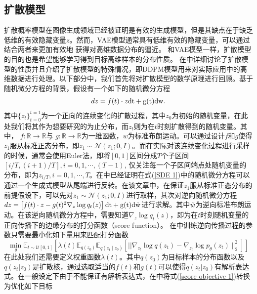 \subsection{扩散模型}
扩散概率模型在图像生成领域已经被证明是有效的生成模型，但是其缺点在于缺乏低维的有效隐藏变量$z$。然而，VAE模型通常具有低维有效的隐藏变量，可以通过结合两者来更加有效地
获得对高维数据分布的逼近。
和VAE模型一样，扩散模型的目的也是希望能够学习得到目标高维样本的分布性质。 在\cite{diffusion}中详细讨论了扩散模型的性质并且介绍了扩散模型的特殊情况，即DDPM模型用来对实际应用中的高维数据进行处理。以下部分中，我们首先将对扩散模型的数学原理进行回顾。基于随机微分方程的背景，假设有一个如下的随机微分方程
\begin{equation}
    dz = f(t)\cdot z \rm{dt}+g(t)\rm{dw}.
    \label{SDE 1}
\end{equation}
其中$\{z_t\}_{t=0}^{t=1}$为一个正向的连续变化的扩散过程，其中$z_0$为初始的随机变量，在此处我们将其作为想要研究的为止分布，而$z_t$则为在$t$时刻扩散得到的随机变量。其中， $f: \mathbb{R}\rightarrow \mathbb{R}$与
 $g: \mathbb{R}\rightarrow \mathbb{R}$为一维函数，$w$为标准布朗运动。可以通过设计$f$和$g$使得$z_1$服从标准正态分布，即$z_1\sim \mathcal{N}(z_1;0,I)$。而在实际对该连续变化过程进行采样的时候，通常会使用Euler法，即将$[0,1]$区间分成$T$个子区间$[i/T,(i+1)/T], i =0,1,\cdots, (T-1)$, 仅关注每一个子区间端点处随机变量的分布，即为$z_{i/T},i=0,1,\cdots,T$。在\cite{diffusion}中已经证明在式(\ref{SDE 1})中的随机微分方程可以通过一个生成式模型从尾端进行反转。在该文章中，在保证$z_1$服从标准正态分布的前提假设下，可以先对$z_1\sim \mathcal{N}(z_1;0,I)$进行取样，其次对逆向随机微分方程 $dz = \left[f(t)\cdot z -g(t)^2 \nabla_z \log q_t(z)\right] \rm{dt} + g(t)d \Tilde{w}$进行求解。其中$\Tilde{w}$为逆向标准布朗运动。在该逆向随机微分方程中，需要知道$\nabla_z \log q_t(z)$，即为在$t$时刻随机变量的正向传播下的边缘分布的打分函数（score function）。
 在\cite{diffusion}中训练逆向传播过程的参数只需要最小化如下量用来匹配打分函数
\begin{equation}
    \min _{{\theta}} \mathbb{E}_{t \sim \mathcal{U}[0,1]}\left[\lambda(t) \mathbb{E}_{q\left({z}_0\right)} \mathbb{E}_{q\left({z}_t \mid {z}_0\right)}\left[|| \nabla_{{z}_t} \log q\left({z}_t\right)-\nabla_{{z}_t} \log p_{{\theta}}\left({z}_t\right) \|_2^2\right]\right]
    \label{score objective 1}
\end{equation}
在此处我们还需要定义权重函数$\lambda(t)$。其中$q(z_0)$为目标样本的分布函数以及$q(z_t|z_0)$是扩散核，通过选取适当的$f(t)$和$g(t)$可以使得$q(z_t|z_0)$有解析表达式。在一般设定下由于不能保证有解析表达式，在\cite{diffusion}中将式(\ref{score objective 1})转换为优化如下目标
